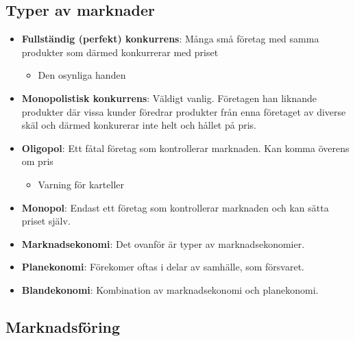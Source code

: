\documentclass{article}
\begin{document}
\subsection{Typer av marknader}
\begin{itemize}
    \item \textbf{Fullständig (perfekt) konkurrens}: \newline
    Många små företag med samma produkter som därmed konkurrerar med priset
    \begin{itemize}
        \item Den osynliga handen
    \end{itemize}
    \item \textbf{Monopolistisk konkurrens}: \newline
    Väldigt vanlig. Företagen han liknande produkter där vissa kunder föredrar 
    produkter från enna företaget av diverse skäl och därmed konkurerar inte helt
    och hållet på pris.
    \item \textbf{Oligopol}: \newline
    Ett fåtal företag som kontrollerar marknaden. Kan komma överens om pris
    \begin{itemize}
        \item Varning för karteller
    \end{itemize}
    \item \textbf{Monopol}: \newline
    Endast ett företag som kontrollerar marknaden och kan sätta priset själv. 
    \item \textbf{Marknadsekonomi}: \newline
    Det ovanför är typer av marknadsekonomier.
    \item \textbf{Planekonomi}: \newline
    Förekomer oftas i delar av samhälle, som försvaret.
    \item \textbf{Blandekonomi}: \newline
    Kombination av marknadsekonomi och planekonomi.
\end{itemize}

\subsection{Marknadsföring}
\end{document}
